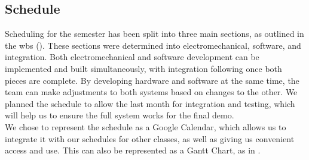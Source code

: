 
\clearpage 

\subsection{Schedule}
\label{sec:schedule}
Scheduling for the semester has been split into three main sections, as outlined in the wbs (). These sections were determined into electromechanical, software, and integration. Both electromechanical and software development can be implemented and built simultaneously, with integration following once both pieces are complete. By developing hardware and software at the same time, the team can make adjustments to both systems based on changes to the other. We planned the schedule to allow the last month for integration and testing, which will help us to ensure the full system works for the final demo. \\
We chose to represent the schedule as a Google Calendar, which allows us to integrate it with our schedules for other classes, as well as giving us convenient access and use. This can also be represented as a Gantt Chart, as in .

